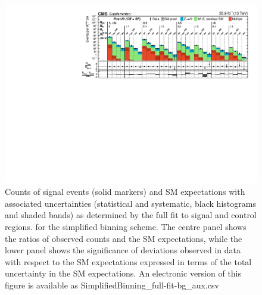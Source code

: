 \begin{figure}[h!]
  \centering
  \includegraphics[width=0.95\linewidth]{Supplementary/CMS-SUS-16-038_Figure-aux_012} 
  \caption{Counts of signal events (solid markers) and SM expectations
    with associated uncertainties (statistical and systematic, black
    histograms and shaded bands) 
    as determined by the full fit to signal and control regions.
    for the simplified binning scheme.
    The centre panel shows the ratios of
    observed counts and the SM expectations, while the lower panel
    shows the significance of deviations observed in data with respect
    to the SM expectations expressed in terms of the total uncertainty
    in the SM expectations.
    An electronic version of this figure is available as SimplifiedBinning\_full-fit-bg\_aux.csv
    }
  \label{fig:aggregated_results_full-fit}
\end{figure}

